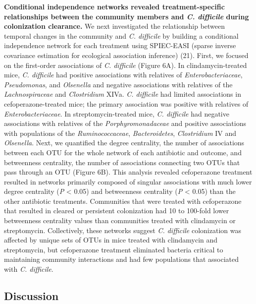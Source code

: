 \documentclass[11pt,]{article}
\begin{document}
\textbf{Conditional independence networks revealed treatment-specific
relationships between the community members and \emph{C. difficile}
during colonization clearance.} We next investigated the relationship
between temporal changes in the community and \emph{C. difficile} by
building a conditional independence network for each treatment using
SPIEC-EASI (sparse inverse covariance estimation for ecological
association inference) (21). First, we focused on the first-order
associations of \emph{C. difficile} (Figure 6A). In clindamycin-treated
mice, \emph{C. difficile} had positive associations with relatives of
\emph{Enterobacteriaceae}, \emph{Pseudomonas}, and \emph{Olsenella} and
negative associations with relatives of the \emph{Lachnospiraceae} and
\emph{Clostridium} XIVa. \emph{C. difficile} had limited associations in
cefoperazone-treated mice; the primary association was positive with
relatives of \emph{Enterobacteriaceae}. In streptomycin-treated mice,
\emph{C. difficile} had negative associations with relatives of the
\emph{Porphyromonadaceae} and positive associations with populations of
the \emph{Ruminococcaceae}, \emph{Bacteroidetes}, \emph{Clostridium} IV
and \emph{Olsenella}. Next, we quantified the degree centrality, the
number of associations between each OTU for the whole network of each
antibiotic and outcome, and betweenness centrality, the number of
associations connecting two OTUs that pass through an OTU (Figure 6B).
This analysis revealed cefoperazone treatment resulted in networks
primarily composed of singular associations with much lower degree
centrality (\emph{P} \textless{} 0.05) and betweenness centrality
(\emph{P} \textless{} 0.05) than the other antibiotic treatments.
Communities that were treated with cefoperazone that resulted in cleared
or persistent colonization had 10 to 100-fold lower betweenness
centrality values than communities treated with clindamycin or
streptomycin. Collectively, these networks suggest \emph{C. difficile}
colonization was affected by unique sets of OTUs in mice treated with
clindamycin and streptomycin, but cefoperazone treatment eliminated
bacteria critical to maintaining community interactions and had few
populations that associated with \emph{C. difficile}.

\hypertarget{discussion}{%
\subsection{Discussion}\label{discussion}}
\end{document}
